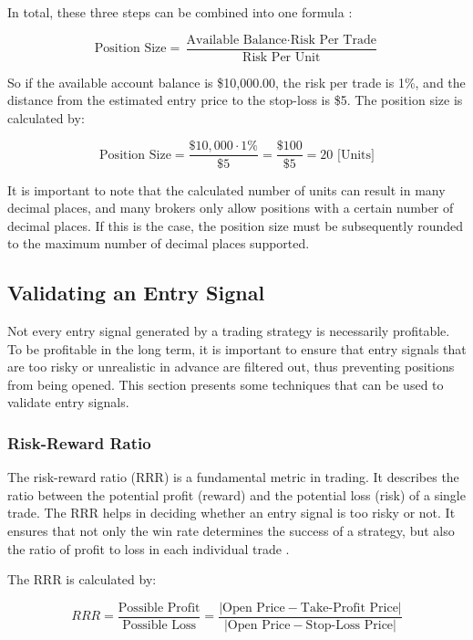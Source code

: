 \noindent
In total, these three steps can be combined into one formula \cite{britannica-position-size}:

\[
    \text{Position Size} = \frac{\text{Available Balance} \cdot \text{Risk Per Trade}}{\text{Risk Per Unit}}
\]

\noindent
So if the available account balance is \$10,000.00, the risk per trade is 1\%, and the distance from the estimated entry price to the stop-loss is \$5.
The position size is calculated by:

\[
    \text{Position Size} = \frac{\$10,000 \cdot 1\%}{\$5}=\frac{\$100}{\$5}=20\text{ [Units]}
\]

\noindent
It is important to note that the calculated number of units can result in many decimal places, and many brokers only allow positions with a certain number of decimal places.
If this is the case, the position size must be subsequently rounded to the maximum number of decimal places supported.

\subsection{Validating an Entry Signal}

Not every entry signal generated by a trading strategy is necessarily profitable.
To be profitable in the long term, it is important to ensure that entry signals that are too risky or unrealistic in advance are filtered out, thus preventing positions from being opened.
This section presents some techniques that can be used to validate entry signals.

\subsubsection{Risk-Reward Ratio}

The risk-reward ratio (RRR) is a fundamental metric in trading.
It describes the ratio between the potential profit (reward) and the potential loss (risk) of a single trade.
The RRR helps in deciding whether an entry signal is too risky or not.
It ensures that not only the win rate determines the success of a strategy, but also the ratio of profit to loss in each individual trade \cite{rrr-base}.

The RRR is calculated by:

\[
    RRR = \frac{\text{Possible Profit}}{\text{Possible Loss}} = \frac{|\text{Open Price} - \text{Take-Profit Price}|}{|\text{Open Price} - \text{Stop-Loss Price}|}
\]

